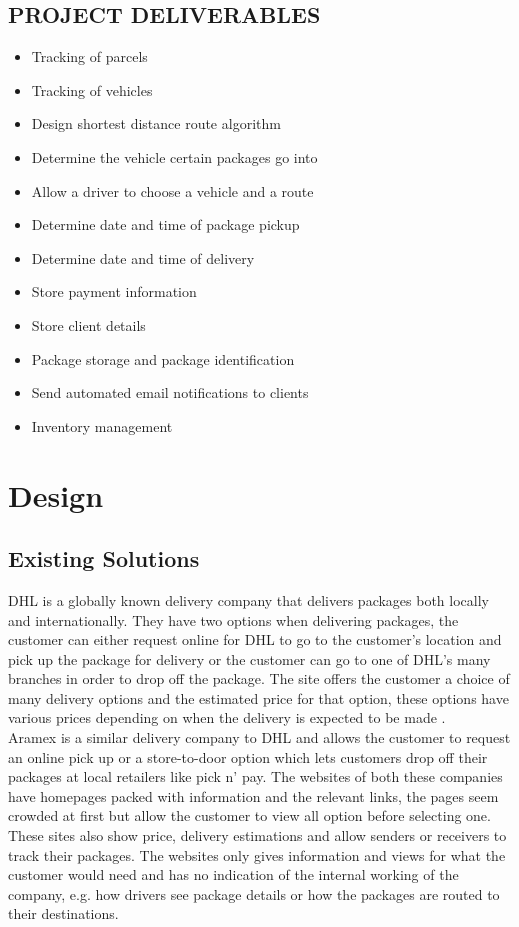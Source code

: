 \documentclass[paper=a4, fontsize=11pt]{scrartcl} %
\numberwithin{equation}{section} %
\numberwithin{figure}{section} %
\numberwithin{table}{section} %
\begin{document}
\subsection{PROJECT DELIVERABLES}


\begin{itemize}
\item Tracking of parcels
\item Tracking of vehicles
\item Design shortest distance route algorithm
\item Determine the vehicle certain packages go into
\item Allow a driver to choose a vehicle and a route
\item Determine date and time of package pickup
\item Determine date and time of delivery
\item Store payment information
\item Store client details
\item Package storage and package identification
\item Send automated email notifications to clients
\item Inventory management
\end{itemize}

\section{Design}

\subsection{Existing Solutions}
DHL is a globally known delivery company that delivers packages both locally and internationally. They have two options when delivering packages, the customer can either request online for DHL to go to the customer's location and pick up the package for delivery or the customer can go to one of DHL's many branches in order to drop off the package. The site offers the customer a choice of many delivery options and the estimated price for that option, these options have various prices depending on when the delivery is expected to be made \cite{DHL}.\\

Aramex is a similar delivery company to DHL and allows the customer to request an online pick up or a store-to-door option which lets customers drop off their packages at local retailers like pick n' pay. The websites of both these companies have homepages packed with information and the relevant links, the pages seem crowded at first but allow the customer to view all option before selecting one. These sites also show price, delivery estimations and allow senders or receivers to track their packages. The websites only gives information and views for what the customer would need and has no indication of the internal working of the company, e.g. how drivers see package details or how the packages are routed to their destinations. \cite{Aramex}
\\
\end{document}
